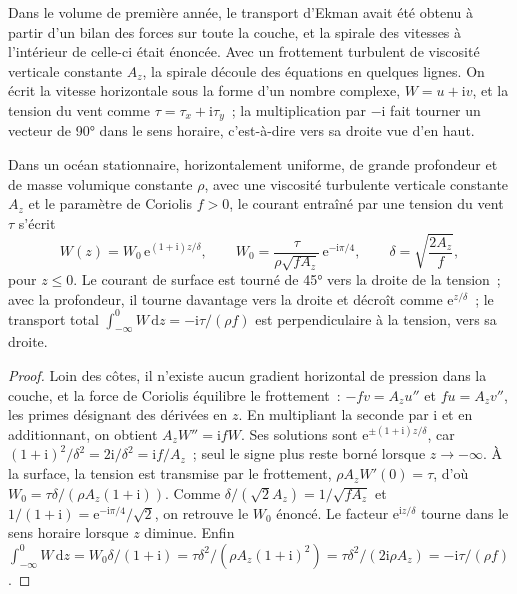 Dans le volume de première année, le transport d'Ekman avait été obtenu à partir d'un bilan des forces
sur toute la couche, et la spirale des vitesses à l'intérieur de celle-ci était énoncée. Avec
un frottement turbulent de viscosité verticale constante $A_z$, la spirale découle
des équations en quelques lignes. On écrit la vitesse horizontale sous la forme
d'un nombre complexe, $W = u + \mathrm iv$, et la tension du vent comme $\tau =
\tau_x + \mathrm i\tau_y$~; la multiplication par $-\mathrm i$ fait tourner un vecteur
de \ang{90} dans le sens horaire, c'est-à-dire vers sa droite vue d'en haut.

\begin{theorem}\label{thm:b3:ocean-dynamics:ekman}
Dans un océan stationnaire, horizontalement uniforme, de grande profondeur et de masse volumique constante
$\rho$, avec une viscosité turbulente verticale constante $A_z$ et le paramètre de Coriolis
$f > 0$, le courant entraîné par une tension du vent $\tau$ s'écrit
\[
W(z) = W_0\,\mathrm e^{(1+\mathrm i)z/\delta},\qquad
W_0 = \frac{\tau}{\rho\sqrt{fA_z}}\,\mathrm e^{-\mathrm i\pi/4},\qquad
\delta = \sqrt{\frac{2A_z}{f}} ,
\]
pour $z \le 0$. Le courant de surface est tourné de \ang{45} vers la droite de la
tension~; avec la profondeur, il tourne davantage vers la droite et décroît comme $\mathrm
e^{z/\delta}$~; le transport total $\int_{-\infty}^0 W\,\mathrm dz =
-\mathrm i\tau/(\rho f)$ est perpendiculaire à la tension, vers sa droite.
\end{theorem}

\begin{proof}
Loin des côtes, il n'existe aucun gradient horizontal de pression dans la couche,
et la force de Coriolis équilibre le frottement~: $-fv = A_z u''$ et $fu =
A_z v''$, les primes désignant des dérivées en $z$. En multipliant la seconde par
$\mathrm i$ et en additionnant, on obtient $A_zW'' = \mathrm ifW$. Ses solutions sont
$\mathrm e^{\pm(1+\mathrm i)z/\delta}$, car $(1+\mathrm i)^2/\delta^2 =
2\mathrm i/\delta^2 = \mathrm if/A_z$~; seul le signe plus reste borné lorsque
$z \to -\infty$. À la surface, la tension est transmise par le frottement,
$\rho A_zW'(0) = \tau$, d'où $W_0 = \tau\delta/(\rho A_z(1+\mathrm i))$.
Comme $\delta/(\sqrt2 A_z) = 1/\sqrt{fA_z}$ et $1/(1+\mathrm i) = \mathrm
e^{-\mathrm i\pi/4}/\sqrt2$, on retrouve le $W_0$ énoncé. Le facteur
$\mathrm e^{\mathrm iz/\delta}$ tourne dans le sens horaire lorsque $z$ diminue. Enfin
$\int_{-\infty}^0 W\,\mathrm dz = W_0\delta/(1+\mathrm i) =
\tau\delta^2/(\rho A_z(1+\mathrm i)^2) = \tau\delta^2/(2\mathrm i\rho A_z)
= -\mathrm i\tau/(\rho f)$.
\end{proof}

